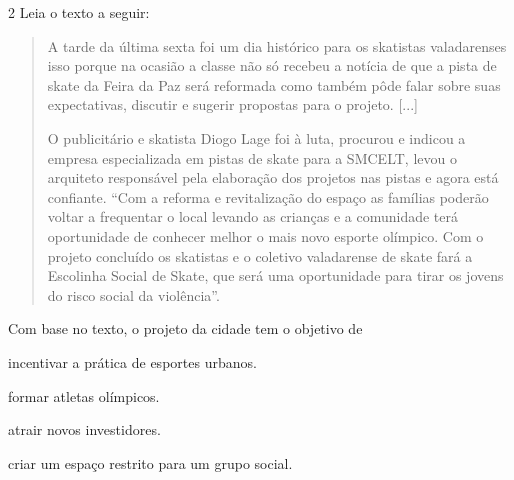 \num{2} Leia o texto a seguir:

\begin{quote}
A tarde da última sexta foi um dia histórico para os skatistas
valadarenses isso porque na ocasião a classe não só recebeu a notícia de
que a pista de skate da Feira da Paz será reformada como também pôde
falar sobre suas expectativas, discutir e sugerir propostas para o
projeto. {[}...{]}

O publicitário e skatista Diogo Lage foi à luta, procurou e indicou a
empresa especializada em pistas de skate para a SMCELT, levou o
arquiteto responsável pela elaboração dos projetos nas pistas e agora
está confiante. ``Com a reforma e revitalização do espaço as famílias
poderão voltar a frequentar o local levando as crianças e a comunidade
terá oportunidade de conhecer melhor o mais novo esporte olímpico. Com o
projeto concluído os skatistas e o coletivo valadarense de skate fará a
Escolinha Social de Skate, que será uma oportunidade para tirar os
jovens do risco social da violência''.

\end{quote}

Com base no texto, o projeto da cidade tem o objetivo de

\begin{escolha}
\item incentivar a prática de esportes urbanos.

\item formar atletas olímpicos.

\item atrair novos investidores.

\item criar um espaço restrito para um grupo social.
\end{escolha}


